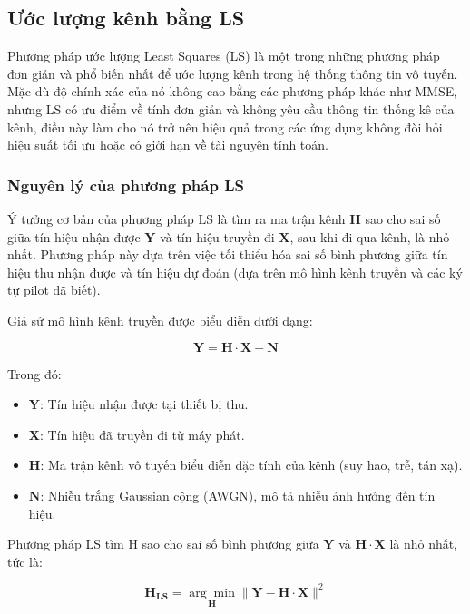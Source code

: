 \subsection{Ước lượng kênh bằng LS}

Phương pháp ước lượng Least Squares (LS) là một trong những phương pháp đơn giản và phổ biến nhất để ước lượng kênh trong hệ thống thông tin vô tuyến. 
Mặc dù độ chính xác của nó không cao bằng các phương pháp khác như MMSE, nhưng LS có ưu điểm về tính đơn giản và không yêu cầu thông tin thống kê của kênh, điều này làm cho nó trở nên hiệu quả trong các ứng dụng không đòi hỏi hiệu suất tối ưu hoặc có giới hạn về tài nguyên tính toán.

\subsubsection{Nguyên lý của phương pháp LS}

Ý tưởng cơ bản của phương pháp LS là tìm ra ma trận kênh $\bm{H}$ 
sao cho sai số giữa tín hiệu nhận được $\bm{Y}$ và tín hiệu truyền đi $\bm{X}$, 
sau khi đi qua kênh, là nhỏ nhất. 
Phương pháp này dựa trên việc tối thiểu hóa sai số bình phương giữa tín hiệu thu nhận được và tín hiệu dự đoán (dựa trên mô hình kênh truyền và các ký tự pilot đã biết).

Giả sử mô hình kênh truyền được biểu diễn dưới dạng:

\begin{equation}
    \bm{Y} = \bm{H} \cdot \bm{X} + \bm{N}
\end{equation}

Trong đó:
\begin{itemize}
    \item $\bm{Y}$: Tín hiệu nhận được tại thiết bị thu.
    \item $\bm{X}$: Tín hiệu đã truyền đi từ máy phát.
    \item $\bm{H}$: Ma trận kênh vô tuyến biểu diễn đặc tính của kênh (suy hao, trễ, tán xạ).
    \item $\bm{N}$: Nhiễu trắng Gaussian cộng (AWGN), mô tả nhiễu ảnh hưởng đến tín hiệu.
\end{itemize}

Phương pháp LS tìm H sao cho sai số bình phương giữa $\bm{Y}$ và 
$\bm{H} \cdot \bm{X}$ là nhỏ nhất, tức là:

\begin{equation}
    \bm{H_{LS}} = \underset{\bm{H}}{\arg \min} \| \bm{Y} - \bm{H} \cdot \bm{X} \|^2
\end{equation}

